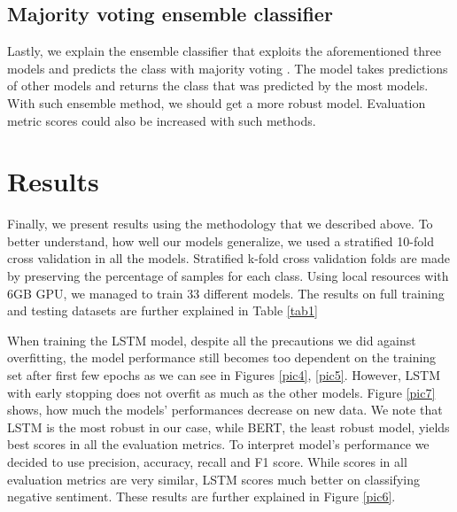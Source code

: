 \documentclass[conference]{IEEEtran}
\begin{document}
\subsection{Majority voting ensemble classifier}
Lastly, we explain the ensemble classifier that exploits the aforementioned three models and predicts the class with majority voting \cite{10.1145/3126858.3126861}. The model takes predictions of other models and returns the class that was predicted by the most models. With such ensemble method, we should get a more robust model. Evaluation metric scores could also be increased with such methods.

\section{Results}
Finally, we present results using the methodology that we described above. To better understand, how well our models generalize, we used a stratified 10-fold cross validation in all the models. Stratified k-fold cross validation folds are made by preserving the percentage of samples for each class.
Using local resources with 6GB GPU, we managed to train 33 different models. The results on full training and testing datasets are further explained in Table \ref{tab1}

When training the LSTM model, despite all the precautions we did against overfitting, the model performance still becomes too dependent on the training set after first few epochs as we can see in Figures \ref{pic4}, \ref{pic5}. However, LSTM with early stopping does not overfit as much as the other models. Figure \ref{pic7} shows, how much the models' performances decrease on new data. We note that LSTM is the most robust in our case, while BERT, the least robust model, yields best scores in all the evaluation metrics. To interpret model's performance we decided to use precision, accuracy, recall and F1 score. While scores in all evaluation metrics are very similar, LSTM scores much better on classifying negative sentiment. These results are further explained in Figure \ref{pic6}.
\end{document}
